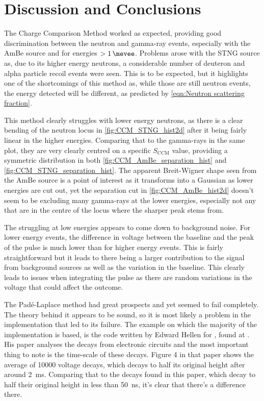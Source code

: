 \documentclass[11pt]{article}
\numberwithin{equation}{section}
\numberwithin{figure}{section}
\numberwithin{table}{section}
\begin{document}
\section{Discussion and Conclusions}\label{sec:Discussion and Conclusions}
\par The Charge Comparison Method worked as expected, providing good discrimination between the neutron and gamma-ray events, especially with the AmBe source and for energies $>\SI{1}{\mevee}$. Problems arose with the STNG source as, due to its higher energy neutrons, a considerable number of deuteron and alpha particle recoil events were seen. This is to be expected, but it highlights one of the shortcomings of this method as, while those are still neutron events, the energy detected will be different, as predicted by \cref{eqn:Neutron scattering fraction}. 
\par This method clearly struggles with lower energy neutrons, as there is a clear bending of the neutron locus in \cref{fig:CCM_STNG_hist2d} after it being fairly linear in the higher energies. Comparing that to the gamma-rays in the same plot, they are very clearly centred on a specific $S_{\mathrm{CCM}}$ value, providing a symmetric distribution in both \cref{fig:CCM_AmBe_separation_hist} and \cref{fig:CCM_STNG_separation_hist}. The apparent Breit-Wigner shape seen from the AmBe source is a point of interest as it transforms into a Gaussian as lower energies are cut out, yet the separation cut in \cref{fig:CCM_AmBe_hist2d} doesn't seem to be excluding many gamma-rays at the lower energies, especially not any that are in the centre of the locus where the sharper peak stems from. 
\par The struggling at low energies appears to come down to background noise. For lower energy events, the difference in voltage between the baseline and the peak of the pulse is much lower than for higher energy events. This is fairly straightforward but it leads to there being a larger contribution to the signal from background sources as well as the variation in the baseline. This clearly leads to issues when integrating the pulse as there are random variations in the voltage that could affect the outcome.
\newline
\par The Pad\'e-Laplace method had great prospects and yet seemed to fail completely. The theory behind it appears to be sound, so it is most likely a problem in the implementation that led to its failure. The example on which the majority of the implementation is based, is the code written by Edward Hellen for \cite{Hellen-Pade}, found at \cite{Hellen-Code}. His paper analyses the decays from electronic circuits and the most important thing to note is the time-scale of these decays. Figure 4 in that paper shows the average of \num{10000} voltage decays, which decays to half its original height after around \SI{2}{\milli\second}. Comparing that to the decays found in this paper, which decay to half their original height in less than \SI{50}{\nano\second}, it's clear that there's a difference there. 
\end{document}
